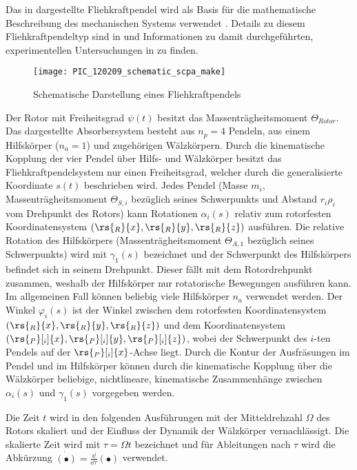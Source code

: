 Das in	 dargestellte Fliehkraftpendel
wird als Basis für die mathematische Beschreibung des mechanischen Systems
verwendet \cite{Mayet:Tautochronic}. Details zu diesem Fliehkraftpendeltyp sind
in \cite{mayet2012euromech} und Informationen zu damit durchgeführten, experimentellen Untersuchungen 
in \cite{Mayet:Experimental} zu finden.
%
%
\begin{figure}[ht]%
	\centering
			\texttt{[image: PIC\_120209\_schematic\_scpa\_make]}
			\caption[Schematische Darstellung eines Fliehkraftpendels]{Schematische Darstellung eines Fliehkraftpendels \cite{mayet2012euromech}}
	\label{fig:Theorie:BildCPVA}
\end{figure}
%
%
%
Der Rotor mit Freiheitsgrad $\psi(t)$ besitzt das Massenträgheitsmoment $\Theta_{Rotor}$.
Das dargestellte Absorbersystem besteht aus $n_p=4$ Pendeln, aus einem Hilfskörper ($n_a=1$)
und zugehörigen Wälzkörpern. 
Durch die kinematische Kopplung der vier Pendel über Hilfs- und Wälzkörper besitzt
das Fliehkraftpendelsystem nur einen Freiheitsgrad, welcher durch die generalisierte Koordinate $s(t)$
beschrieben wird. 
%
Jedes Pendel (Masse $m_i$, Massenträgheitsmoment $\Theta_{S,i}$ bezüglich seines Schwerpunkts und
Abstand $r_i \rho_i$ vom Drehpunkt des Rotors) kann Rotationen $\alpha_i(s)$ relativ
zum rotorfesten Koordinatensystem  $(\rs{_R}{x},\rs{_R}{y},\rs{_R}{z})$ ausführen. 
Die relative Rotation des Hilfskörpers (Massenträgheitsmoment $\Theta_{A,1}$ bezüglich seines Schwerpunkts)
wird mit $\gamma_1(s)$ bezeichnet und der Schwerpunkt des Hilfskörpers befindet sich in seinem
Drehpunkt. Dieser fällt mit dem Rotordrehpunkt zusammen, weshalb der Hilfskörper nur rotatorische
Bewegungen ausführen kann. Im allgemeinen Fall können beliebig viele Hilfskörper $n_a$ verwendet werden.
%
Der Winkel $\varphi_i (s)$ ist der Winkel zwischen dem rotorfesten Koordinatensystem 
$(\rs{_R}{x},\rs{_R}{y},\rs{_R}{z})$ und dem Koordinatensystem $(\rs{_P}[_i]{x},\rs{_P}[_i]{y},\rs{_P}[_i]{z})$, 
wobei der Schwerpunkt des $i$-ten Pendels auf der $\rs{_P}[_i]{x}$-Achse liegt.
%
Durch die Kontur der Ausfräsungen im Pendel und im Hilfskörper  können 
durch die kinematische Kopplung über die Wälzkörper beliebige,
nichtlineare, kinematische Zusammenhänge zwischen $\alpha_i(s)$ und $\gamma_1(s)$ vorgegeben werden.



Die Zeit $t$ wird in den folgenden Ausführungen mit der Mitteldrehzahl $\Omega$ des Rotors
skaliert und der Einfluss der Dynamik der Wälzkörper vernachlässigt.
Die skalierte Zeit wird mit $\tau = \Omega t$ bezeichnet und für Ableitungen 
nach $\tau$ wird die Abkürzung $ \dot{\left(\bullet\right)} =\frac{\dd}{\dd{\tau}}\left(\bullet\right)$ verwendet.

